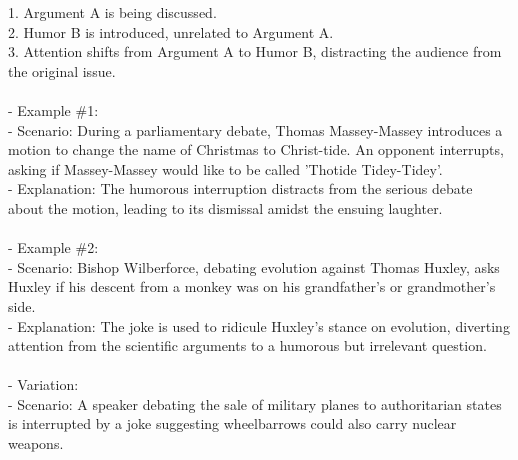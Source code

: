 \documentclass[a4paper,12pt,single,pdftex]{scrartcl}
\begin{document}
    
        1. Argument A is being discussed.
    \\

    
        2. Humor B is introduced, unrelated to Argument A.
    \\

    
        3. Attention shifts from Argument A to Humor B, distracting the audience from the original issue.
    \\

    
      
    \\

    
      - Example \#1:
    \\

    
        - Scenario: During a parliamentary debate, Thomas Massey-Massey introduces a motion to change the name of Christmas to Christ-tide. An opponent interrupts, asking if Massey-Massey would like to be called 'Thotide Tidey-Tidey'.
    \\

    
        - Explanation: The humorous interruption distracts from the serious debate about the motion, leading to its dismissal amidst the ensuing laughter.
    \\

    
      
    \\

    
      - Example \#2:
    \\

    
        - Scenario: Bishop Wilberforce, debating evolution against Thomas Huxley, asks Huxley if his descent from a monkey was on his grandfather’s or grandmother’s side.
    \\

    
        - Explanation: The joke is used to ridicule Huxley's stance on evolution, diverting attention from the scientific arguments to a humorous but irrelevant question.
    \\

    
      
    \\

    
      - Variation:
    \\

    
        - Scenario: A speaker debating the sale of military planes to authoritarian states is interrupted by a joke suggesting wheelbarrows could also carry nuclear weapons.
    \\
\end{document}

